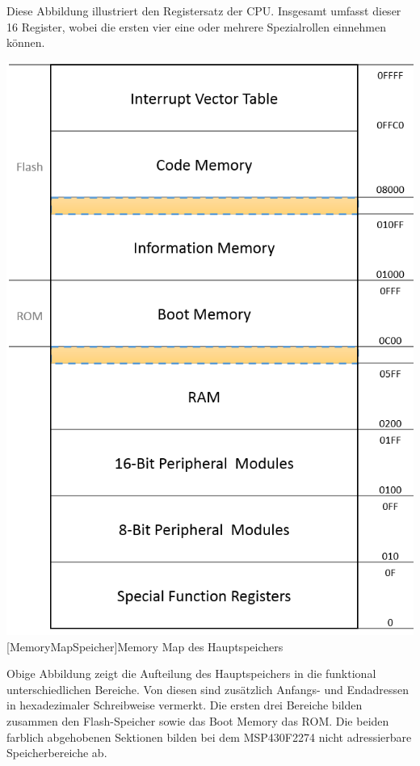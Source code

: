 \documentclass[12pt,a4paper,bibliography=totocnumbered,listof=totocnumbered]{scrartcl}
\begin{document}
Diese Abbildung illustriert den Registersatz der CPU. Insgesamt umfasst dieser 16 Register, wobei die ersten vier eine oder mehrere Spezialrollen einnehmen können.

\vspace{1em}
\begin{minipage}{\linewidth}
	\centering
	\includegraphics[width=0.7\linewidth]{img/MemoryMapSpeicher.png}
	[MemoryMapSpeicher]{Memory Map des Hauptspeichers}
	\label{fig:MemoryMapSpeicher}
\end{minipage}
\vspace{0.5em}

Obige Abbildung zeigt die Aufteilung des Hauptspeichers in die funktional unterschiedlichen Bereiche. Von diesen sind zusätzlich Anfangs- und Endadressen in hexadezimaler Schreibweise vermerkt. Die ersten drei Bereiche bilden zusammen den Flash-Speicher sowie das Boot Memory das ROM. Die beiden farblich abgehobenen Sektionen bilden bei dem MSP430F2274 nicht adressierbare Speicherbereiche ab.
\end{document}

